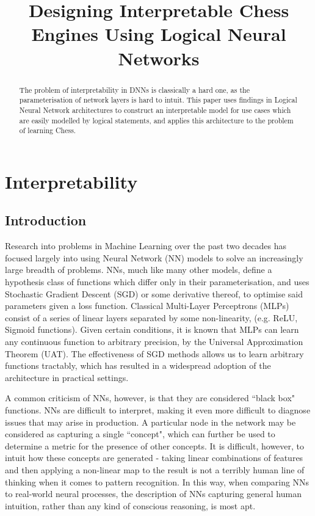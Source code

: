 \documentclass[conference]{report}
\begin{document}
\def\T{\textbf{T}}
\def\F{\textbf{F}}
\def\NOT{\texttt{NOT}}
\def\AND{\texttt{AND}}
\def\OR{\texttt{OR}}
\def\R{\mathbb{R}}
\def\B{\mathbb{B}}

\title{\LARGE Designing Interpretable Chess Engines Using Logical Neural Networks}

\maketitle
\thispagestyle{plain}
\pagestyle{plain}

\begin{abstract}
The problem of interpretability in DNNs is classically a hard one, as the parameterisation of network layers is hard to intuit. This paper uses findings in Logical Neural Network architectures to construct an interpretable model for use cases which are easily modelled by logical statements, and applies this architecture to the problem of learning Chess.  
\end{abstract}

\tableofcontents

\pagebreak

\chapter{Interpretability}

\section{Introduction}

Research into problems in Machine Learning over the past two decades has focused largely into using Neural Network (NN) models to solve an increasingly large breadth of problems. NNs, much like many other models, define a hypothesis class of functions which differ only in their parameterisation, and uses Stochastic Gradient Descent (SGD) or some derivative thereof, to optimise said parameters given a loss function. Classical Multi-Layer Perceptrons (MLPs) consist of a series of linear layers separated by some non-linearity, (e.g. ReLU, Sigmoid functions). Given certain conditions, it is known that MLPs can learn any continuous function to arbitrary precision, by the Universal Approximation Theorem (UAT). The effectiveness of SGD methods allows us to learn arbitrary functions tractably, which has resulted in a widespread adoption of the architecture in practical settings.

A common criticism of NNs, however, is that they are considered ``black box" functions. NNs are difficult to interpret, making it even more difficult to diagnose issues that may arise in production. A particular node in the network may be considered as capturing a single ``concept", which can further be used to determine a metric for the presence of other concepts. It is difficult, however, to intuit how these concepts are generated - taking linear combinations of features and then applying a non-linear map to the result is not a terribly human line of thinking when it comes to pattern recognition. In this way, when comparing NNs to real-world neural processes, the description of NNs capturing general human intuition, rather than any kind of conscious reasoning, is most apt.
\end{document}
